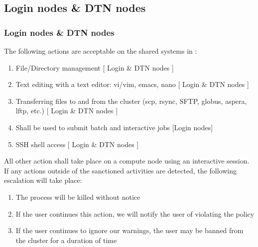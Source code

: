 \subsection{Login nodes \& DTN nodes}
\begin{frame}
\frametitle{Login nodes \& DTN nodes}
\begin{block}{}
The following actions are acceptable on the shared systems in {\mana}:
\begin{enumerate}
\item File/Directory management [ Login \& DTN nodes ]
\item Text editing with a text editor: vi/vim, emacs, nano [ Login \& DTN nodes ]
\item Transferring files to and from the cluster (scp, rsync, SFTP, globus, aspera, lftp, etc.) [ Login \& DTN nodes ]
\item Shall be used to submit batch and interactive jobs [Login nodes]
\item SSH shell access [ Login \& DTN nodes ]
\end{enumerate}
\end{block}

\begin{block}{}
All other action shall take place on a compute node using an interactive session.  
If any actions outside of the sanctioned activities are detected, the following escalation will take place:
\begin{enumerate}
\item The process will be killed without notice
\item If the user continues this action, we will notify the user of violating the policy
\item If the user continues to ignore our warnings, the user may be banned from the cluster for a duration of time
\end{enumerate}
\end{block}
\end{frame}

